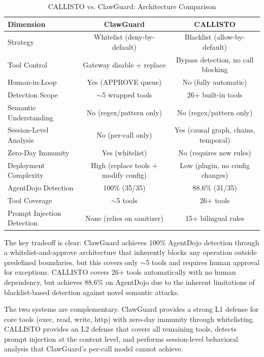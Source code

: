 \documentclass[10pt,conference]{IEEEtran}
\begin{document}
\begin{table}[!t]
\renewcommand{\arraystretch}{1.1}
\caption{CALLISTO vs. ClawGuard: Architecture Comparison}
\label{tab:comparison}
\centering
\small
\begin{tabular}{@{}lcc@{}}
\toprule
\textbf{Dimension} & \textbf{ClawGuard} & \textbf{CALLISTO} \\
\midrule
Strategy & Whitelist (deny-by-default) & Blacklist (allow-by-default) \\
Tool Control & Gateway disable + replace & Bypass detection, no call blocking \\
Human-in-Loop & Yes (APPROVE queue) & No (fully automatic) \\
Detection Scope & $\sim$5 wrapped tools & 26+ built-in tools \\
Semantic Understanding & No (regex/pattern only) & No (regex/pattern only) \\
Session-Level Analysis & No (per-call only) & Yes (causal graph, chains, temporal) \\
Zero-Day Immunity & Yes (whitelist) & No (requires new rules) \\
Deployment Complexity & High (replace tools + modify config) & Low (plugin, no config changes) \\
AgentDojo Detection & 100\% (35/35) & 88.6\% (31/35) \\
Tool Coverage & $\sim$5 tools & 26+ tools \\
Prompt Injection Detection & None (relies on sanitizer) & 15+ bilingual rules \\
\bottomrule
\end{tabular}
\end{table}

The key tradeoff is clear: ClawGuard achieves 100\% AgentDojo detection through a whitelist-and-approve architecture that inherently blocks any operation outside predefined boundaries, but this covers only $\sim$5 tools and requires human approval for exceptions. CALLISTO covers 26+ tools automatically with no human dependency, but achieves 88.6\% on AgentDojo due to the inherent limitations of blacklist-based detection against novel semantic attacks.

The two systems are complementary. ClawGuard provides a strong L1 defense for core tools (exec, read, write, http) with zero-day immunity through whitelisting. CALLISTO provides an L2 defense that covers all remaining tools, detects prompt injection at the content level, and performs session-level behavioral analysis that ClawGuard's per-call model cannot achieve.
\end{document}
